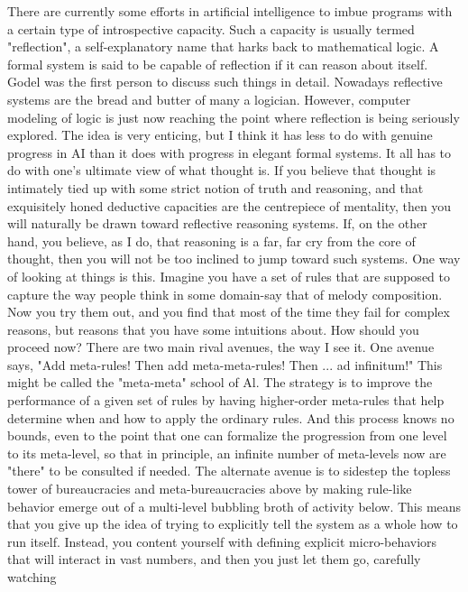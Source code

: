          There are currently some efforts in artificial intelligence to imbue programs
with a certain type of introspective capacity. Such a capacity is usually termed
"reflection", a self-explanatory name that harks back to mathematical logic. A formal
system is said to be capable of reflection if it can reason about itself. Godel was the
first person to discuss such things in detail. Nowadays reflective systems are the bread
and butter of many a logician. However, computer modeling of logic is just now
reaching the point where reflection is being seriously explored.
         The idea is very enticing, but I think it has less to do with genuine progress in
AI than it does with progress in elegant formal systems. It all has to do with one's
ultimate view of what thought is. If you believe that thought is intimately tied up with
some strict notion of truth and reasoning, and that exquisitely honed deductive
capacities are the centrepiece of mentality, then you will naturally be drawn toward
reflective reasoning systems. If, on the other hand, you believe, as I do, that reasoning
is a far, far cry from the core of thought, then you will not be too inclined to jump
toward such systems.
         One way of looking at things is this. Imagine you have a set of rules that are
supposed to capture the way people think in some domain-say that of melody
composition. Now you try them out, and you find that most of the time they fail for
complex reasons, but reasons that you have some intuitions about. How should you
proceed now? There are two main rival avenues, the way I see it.
         One avenue says, "Add meta-rules! Then add meta-meta-rules! Then ... ad
infinitum!" This might be called the "meta-meta" school of Al. The strategy is to
improve the performance of a given set of rules by having higher-order meta-rules
that help determine when and how to apply the ordinary rules. And this process
knows no bounds, even to the point that one can formalize the progression from one
level to its meta-level, so that in principle, an infinite number of meta-levels now are
"there" to be consulted if needed.
         The alternate avenue is to sidestep the topless tower of bureaucracies and
meta-bureaucracies above by making rule-like behavior emerge out of a multi-level
bubbling broth of activity below. This means that you give up the idea of trying to
explicitly tell the system as a whole how to run itself. Instead, you content yourself
with defining explicit micro-behaviors that will interact in vast numbers, and then you
just let them go, carefully watching





